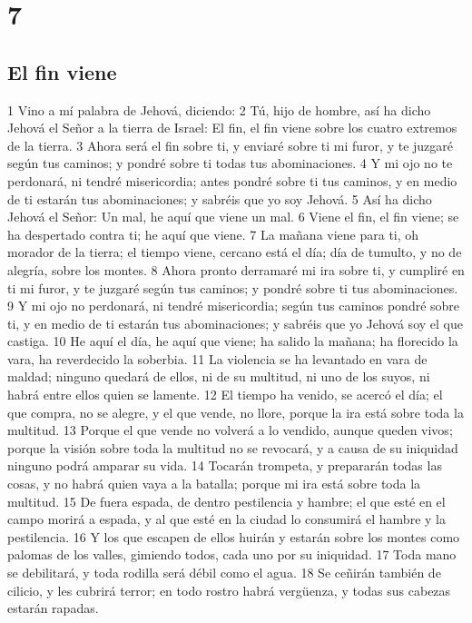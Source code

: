 \chapter{7}

\section*{El fin viene}

1 Vino a mí palabra de Jehová, diciendo:
2 Tú, hijo de hombre, así ha dicho Jehová el Señor a la tierra de Israel: El fin, el fin viene sobre los cuatro extremos de la tierra.
3 Ahora será el fin sobre ti, y enviaré sobre ti mi furor, y te juzgaré según tus caminos; y pondré sobre ti todas tus abominaciones.
4 Y mi ojo no te perdonará, ni tendré misericordia; antes pondré sobre ti tus caminos, y en medio de ti estarán tus abominaciones; y sabréis que yo soy Jehová.
5 Así ha dicho Jehová el Señor: Un mal, he aquí que viene un mal.
6 Viene el fin, el fin viene; se ha despertado contra ti; he aquí que viene.
7 La mañana viene para ti, oh morador de la tierra; el tiempo viene, cercano está el día; día de tumulto, y no de alegría, sobre los montes.
8 Ahora pronto derramaré mi ira sobre ti, y cumpliré en ti mi furor, y te juzgaré según tus caminos; y pondré sobre ti tus abominaciones.
9 Y mi ojo no perdonará, ni tendré misericordia; según tus caminos pondré sobre ti, y en medio de ti estarán tus abominaciones; y sabréis que yo Jehová soy el que castiga.
10 He aquí el día, he aquí que viene; ha salido la mañana; ha florecido la vara, ha reverdecido la soberbia.
11 La violencia se ha levantado en vara de maldad; ninguno quedará de ellos, ni de su multitud, ni uno de los suyos, ni habrá entre ellos quien se lamente.
12 El tiempo ha venido, se acercó el día; el que compra, no se alegre, y el que vende, no llore, porque la ira está sobre toda la multitud.
13 Porque el que vende no volverá a lo vendido, aunque queden vivos; porque la visión sobre toda la multitud no se revocará, y a causa de su iniquidad ninguno podrá amparar su vida.
14 Tocarán trompeta, y prepararán todas las cosas, y no habrá quien vaya a la batalla; porque mi ira está sobre toda la multitud.
15 De fuera espada, de dentro pestilencia y hambre; el que esté en el campo morirá a espada, y al que esté en la ciudad lo consumirá el hambre y la pestilencia.
16 Y los que escapen de ellos huirán y estarán sobre los montes como palomas de los valles, gimiendo todos, cada uno por su iniquidad.
17 Toda mano se debilitará, y toda rodilla será débil como el agua.
18 Se ceñirán también de cilicio, y les cubrirá terror; en todo rostro habrá vergüenza, y todas sus cabezas estarán rapadas.
